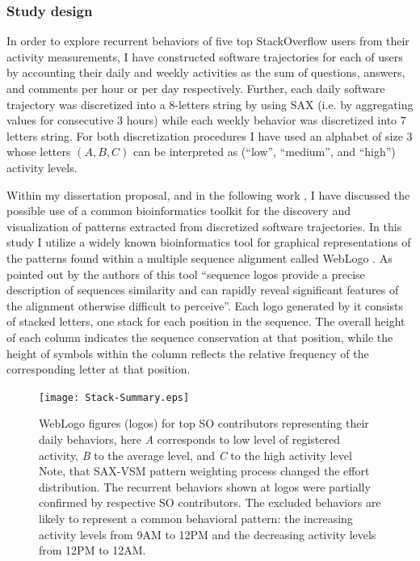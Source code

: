 \subsubsection{Study design}
In order to explore recurrent behaviors of five top StackOverflow users from their activity measurements, I have constructed software trajectories for each of users by accounting their daily and weekly activities as the sum of questions, answers, and comments per hour or per day respectively. Further, each daily software trajectory was discretized into a 8-letters string by using SAX (i.e. by aggregating values for consecutive 3 hours) while each weekly behavior was discretized into 7 letters string. For both discretization procedures I have used an alphabet of size 3 whose letters $(A,B,C)$ can be interpreted as (``low'', ``medium'', and ``high'') activity levels.

Within my dissertation proposal, and in the following work \cite{csdl2-10-09}, I have discussed the possible use of a common bioinformatics toolkit for the discovery and visualization of patterns extracted from discretized software trajectories. In this study I utilize a widely known bioinformatics tool for graphical representations of the patterns found within a multiple sequence alignment called WebLogo \cite{weblogo}. As pointed out by the authors of this tool ``sequence logos provide a precise description of sequences similarity and can rapidly reveal significant features of the alignment otherwise difficult to perceive''. Each logo generated by it consists of stacked letters, one stack for each position in the sequence. The overall height of each column indicates the sequence conservation at that position, while the height of symbols within the column reflects the relative frequency of the corresponding letter at that position.
\begin{figure}[t]
   \centering
   \texttt{[image: Stack-Summary.eps]}
   \caption{WebLogo figures (logos) for top SO contributors representing their daily behaviors, here \textit{A} corresponds to low level of registered activity, \textit{B} to the average level, and \textit{C} to the high activity level Note, that SAX-VSM pattern weighting process changed the effort distribution. The recurrent behaviors shown at logos were partially confirmed by respective SO contributors. The excluded behaviors are likely to represent a common behavioral pattern: the increasing activity levels from 9AM to 12PM and the decreasing activity levels from 12PM to 12AM.}
   \label{fig:stack_daily}   
\end{figure}

